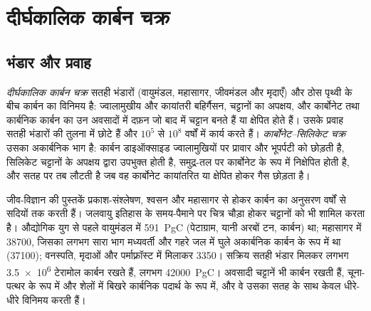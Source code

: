 \section{दीर्घकालिक कार्बन चक्र}\label{sec:b2:deep-time-climate:cycle}

\subsection*{भंडार और प्रवाह}

\begin{definition}[दीर्घकालिक कार्बन चक्र; कार्बोनेट--सिलिकेट चक्र]\label{def:b2:deep-time-climate:carbon-cycle}
\emph{दीर्घकालिक कार्बन चक्र} सतही भंडारों (वायुमंडल, महासागर,
जीवमंडल और मृदाएँ) और ठोस पृथ्वी के बीच कार्बन का विनिमय है: ज्वालामुखीय और
कायांतरी बहिर्गैसन, चट्टानों का अपक्षय, और कार्बोनेट तथा कार्बनिक कार्बन का उन अवसादों में दफ़न
जो बाद में चट्टान बनते हैं या क्षेपित होते हैं। उसके प्रवाह सतही भंडारों की तुलना में छोटे हैं
और $10^5$ से $10^8$ वर्षों में कार्य करते हैं। \emph{कार्बोनेट--सिलिकेट
चक्र} उसका अकार्बनिक भाग है: कार्बन डाइऑक्साइड ज्वालामुखियों पर प्रावार
और भूपर्पटी को छोड़ती है, सिलिकेट चट्टानों के अपक्षय द्वारा उपभुक्त होती है, समुद्र-तल पर
कार्बोनेट के रूप में निक्षेपित होती है, और सतह पर तब लौटती है जब वह कार्बोनेट कायांतरित या
क्षेपित होकर गैस छोड़ता है।
\end{definition}

जीव-विज्ञान की पुस्तकें प्रकाश-संश्लेषण, श्वसन और महासागर से होकर कार्बन का अनुसरण वर्षों से
सदियों तक करती हैं। जलवायु इतिहास के समय-पैमाने पर चित्र चौड़ा होकर चट्टानों को भी शामिल करता है।
औद्योगिक युग से पहले वायुमंडल में \qty{591}{PgC} (पेटाग्राम, यानी अरबों टन, कार्बन) था;
महासागर में \num{38700}, जिसका लगभग सारा भाग मध्यवर्ती और गहरे जल में घुले अकार्बनिक कार्बन के रूप में था
(\num{37100}); वनस्पति, मृदाओं और पर्माफ़्रॉस्ट में मिलाकर \num{3350}। सक्रिय
सतही भंडार मिलकर लगभग \num{3.5e6} टेरामोल कार्बन रखते हैं, लगभग
\qty{42000}{PgC}। अवसादी चट्टानें भी कार्बन रखती हैं, चूना-पत्थर के रूप में और शेलों में बिखरे
कार्बनिक पदार्थ के रूप में, और वे उसका सतह के साथ केवल धीरे-धीरे विनिमय करती हैं।

